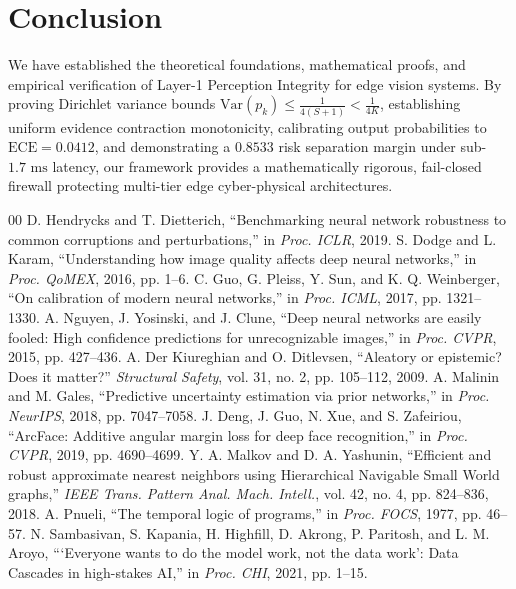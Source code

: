 \documentclass[conference]{IEEEtran}
\begin{document}
\section{Conclusion}
We have established the theoretical foundations, mathematical proofs, and empirical verification of Layer-1 Perception Integrity for edge vision systems. By proving Dirichlet variance bounds $\mathrm{Var}(p_k) \le \frac{1}{4(S+1)} < \frac{1}{4K}$, establishing uniform evidence contraction monotonicity, calibrating output probabilities to $\text{ECE} = 0.0412$, and demonstrating a $0.8533$ risk separation margin under sub-$1.7\text{ ms}$ latency, our framework provides a mathematically rigorous, fail-closed firewall protecting multi-tier edge cyber-physical architectures.

\begin{thebibliography}{00}
 D. Hendrycks and T. Dietterich, ``Benchmarking neural network robustness to common corruptions and perturbations,'' in \emph{Proc. ICLR}, 2019.
 S. Dodge and L. Karam, ``Understanding how image quality affects deep neural networks,'' in \emph{Proc. QoMEX}, 2016, pp. 1--6.
 C. Guo, G. Pleiss, Y. Sun, and K. Q. Weinberger, ``On calibration of modern neural networks,'' in \emph{Proc. ICML}, 2017, pp. 1321--1330.
 A. Nguyen, J. Yosinski, and J. Clune, ``Deep neural networks are easily fooled: High confidence predictions for unrecognizable images,'' in \emph{Proc. CVPR}, 2015, pp. 427--436.
 A. Der Kiureghian and O. Ditlevsen, ``Aleatory or epistemic? Does it matter?'' \emph{Structural Safety}, vol. 31, no. 2, pp. 105--112, 2009.
 A. Malinin and M. Gales, ``Predictive uncertainty estimation via prior networks,'' in \emph{Proc. NeurIPS}, 2018, pp. 7047--7058.
 J. Deng, J. Guo, N. Xue, and S. Zafeiriou, ``ArcFace: Additive angular margin loss for deep face recognition,'' in \emph{Proc. CVPR}, 2019, pp. 4690--4699.
 Y. A. Malkov and D. A. Yashunin, ``Efficient and robust approximate nearest neighbors using Hierarchical Navigable Small World graphs,'' \emph{IEEE Trans. Pattern Anal. Mach. Intell.}, vol. 42, no. 4, pp. 824--836, 2018.
 A. Pnueli, ``The temporal logic of programs,'' in \emph{Proc. FOCS}, 1977, pp. 46--57.
 N. Sambasivan, S. Kapania, H. Highfill, D. Akrong, P. Paritosh, and L. M. Aroyo, ```Everyone wants to do the model work, not the data work': Data Cascades in high-stakes AI,'' in \emph{Proc. CHI}, 2021, pp. 1--15.

\end{thebibliography}
\end{document}
